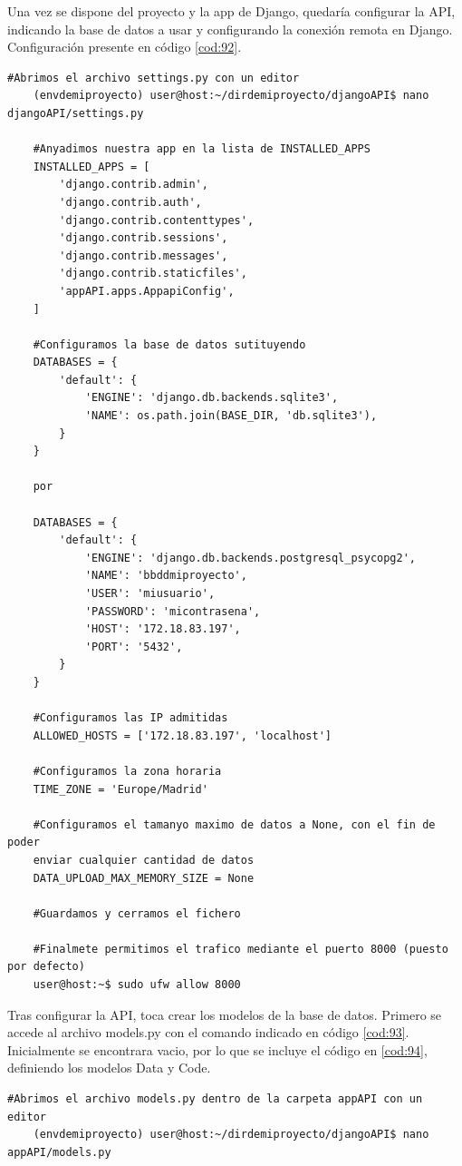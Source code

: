 Una vez se dispone del proyecto y la app de Django, quedaría configurar la API, indicando la base de datos a usar y configurando la conexión remota en Django. Configuración presente en código \ref{cod:92}.

\begin{lstlisting}[caption={Instrucciones por consola y editor de texto para la configuración de la API Django}, label=cod:92]
	#Abrimos el archivo settings.py con un editor
	(envdemiproyecto) user@host:~/dirdemiproyecto/djangoAPI$ nano djangoAPI/settings.py
	
	#Anyadimos nuestra app en la lista de INSTALLED_APPS
	INSTALLED_APPS = [
		'django.contrib.admin',
		'django.contrib.auth',
		'django.contrib.contenttypes',
		'django.contrib.sessions',
		'django.contrib.messages',
		'django.contrib.staticfiles',
		'appAPI.apps.AppapiConfig',
	]
	
	#Configuramos la base de datos sutituyendo
	DATABASES = {
		'default': {
			'ENGINE': 'django.db.backends.sqlite3',
			'NAME': os.path.join(BASE_DIR, 'db.sqlite3'),
		}
	}
	
	por
	
	DATABASES = {
		'default': {
			'ENGINE': 'django.db.backends.postgresql_psycopg2',
			'NAME': 'bbddmiproyecto',
			'USER': 'miusuario',
			'PASSWORD': 'micontrasena',
			'HOST': '172.18.83.197',
			'PORT': '5432',
		}
	}
	
	#Configuramos las IP admitidas
	ALLOWED_HOSTS = ['172.18.83.197', 'localhost']
	
	#Configuramos la zona horaria
	TIME_ZONE = 'Europe/Madrid'
	
	#Configuramos el tamanyo maximo de datos a None, con el fin de poder
	enviar cualquier cantidad de datos
	DATA_UPLOAD_MAX_MEMORY_SIZE = None
	
	#Guardamos y cerramos el fichero
	
	#Finalmete permitimos el trafico mediante el puerto 8000 (puesto por defecto)
	user@host:~$ sudo ufw allow 8000
\end{lstlisting}

Tras configurar la API, toca crear los modelos de la base de datos. Primero se accede al archivo models.py con el comando indicado en código \ref{cod:93}. Inicialmente se encontrara vacio, por lo que  se incluye el código en \ref{cod:94}, definiendo los modelos Data y Code.

\begin{lstlisting}[caption={Instrucción por consola para abrir models.py en un editor de texto}, label=cod:93]
	#Abrimos el archivo models.py dentro de la carpeta appAPI con un editor
	(envdemiproyecto) user@host:~/dirdemiproyecto/djangoAPI$ nano appAPI/models.py
\end{lstlisting}

